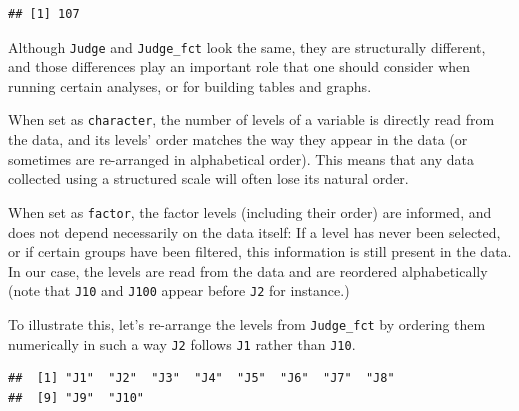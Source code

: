 \documentclass[
]{krantz}
\makeatletter
\newenvironment{Shaded}{\begin{snugshade}}{\end{snugshade}}
\newcommand{\AttributeTok}[1]{\textcolor[rgb]{0.61,0.61,0.61}{#1}}
\newcommand{\ConstantTok}[1]{\textcolor[rgb]{0,0,0}{#1}}
\newcommand{\DecValTok}[1]{\textcolor[rgb]{0.06,0.06,0.06}{#1}}
\newcommand{\FunctionTok}[1]{\textcolor[rgb]{0,0,0}{#1}}
\newcommand{\NormalTok}[1]{#1}
\newcommand{\OtherTok}[1]{\textcolor[rgb]{0.37,0.37,0.37}{#1}}
\newcommand{\SpecialCharTok}[1]{\textcolor[rgb]{0,0,0}{#1}}
\renewenvironment{quote}{\begin{VF}}{\end{VF}}
\newenvironment{kframe}{%
\medskip{}
\setlength{\fboxsep}{.8em}
 \def\at@end@of@kframe{}%
 \ifinner\ifhmode%
  \def\at@end@of@kframe{\end{minipage}}%
  \begin{minipage}{\columnwidth}%
 \fi\fi%
 \def\FrameCommand##1{\hskip\@totalleftmargin \hskip-\fboxsep
 \colorbox{shadecolor}{##1}\hskip-\fboxsep
     \hskip-\linewidth \hskip-\@totalleftmargin \hskip\columnwidth}%
 \MakeFramed {\advance\hsize-\width
   \@totalleftmargin\z@ \linewidth\hsize
   \@setminipage}}%
 {\par\unskip\endMakeFramed%
 \at@end@of@kframe}
\renewenvironment{Shaded}{\begin{kframe}}{\end{kframe}}
\makeatother
\begin{document}
\begin{verbatim}
## [1] 107
\end{verbatim}

\begin{quote}
Although \texttt{Judge} and \texttt{Judge\_fct} look the same, they are structurally different, and those differences play an important role that one should consider when running certain analyses, or for building tables and graphs.
\end{quote}

When set as \texttt{character}, the number of levels of a variable is directly read from the data, and its levels' order matches the way they appear in the data (or sometimes are re-arranged in alphabetical order). This means that any data collected using a structured scale will often lose its natural order.

When set as \texttt{factor}, the factor levels (including their order) are informed, and does not depend necessarily on the data itself: If a level has never been selected, or if certain groups have been filtered, this information is still present in the data. In our case, the levels are read from the data and are reordered alphabetically (note that \texttt{J10} and \texttt{J100} appear before \texttt{J2} for instance.)

To illustrate this, let's re-arrange the levels from \texttt{Judge\_fct} by ordering them numerically in such a way \texttt{J2} follows \texttt{J1} rather than \texttt{J10}.

\begin{Shaded}
\end{Shaded}

\begin{verbatim}
##  [1] "J1"  "J2"  "J3"  "J4"  "J5"  "J6"  "J7"  "J8" 
##  [9] "J9"  "J10"
\end{verbatim}
\end{document}
